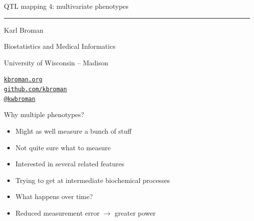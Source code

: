 \documentclass[12pt]{article}
\newcommand{\titlesize}{\fontsize{40}{50} \selectfont}
\newcommand{\headsize}{\fontsize{35}{35} \selectfont}
\newcommand{\textsize}{\fontsize{30}{35} \selectfont}
\newcommand{\smallsize}{\fontsize{25}{30} \selectfont}
\begin{document}
\thispagestyle{empty}

\begin{center}
\titlesize \color{myyellow}


\vspace*{15mm}

QTL mapping 4: multivariate phenotypes

\color{mypink}
\rule{10in}{1mm}

\vspace{5mm}

\textsize \color{myblue}
Karl Broman
\vspace{5mm}

\color{mywhite}
{\smallsize Biostatistics and Medical Informatics

University of Wisconsin -- Madison
\vspace{20mm}


\href{http://kbroman.org}{\tt kbroman.org} \\[3pt]
\href{https://github.com/kbroman}{\tt github.com/kbroman} \\
\href{https://twitter.com/kwbroman}{\tt @kwbroman}
}

\end{center}



\newpage

\headsize \color{myyellow}
\hfill \begin{minipage}{5.75in}
\centering
Why multiple phenotypes?
\end{minipage}

\vspace{30mm}

\color{mywhite} \smallsize

\hspace*{0.5in}
\begin{minipage}[t]{9.5in}
  \begin{itemize}
  \item Might as well measure a bunch of stuff
  \item Not quite sure what to measure
  \item Interested in several related features
  \item Trying to get at intermediate biochemical processes
  \item What happens over time?
  \item Reduced measurement error $\rightarrow$ greater power
  \end{itemize}
\end{minipage}
\end{document}
